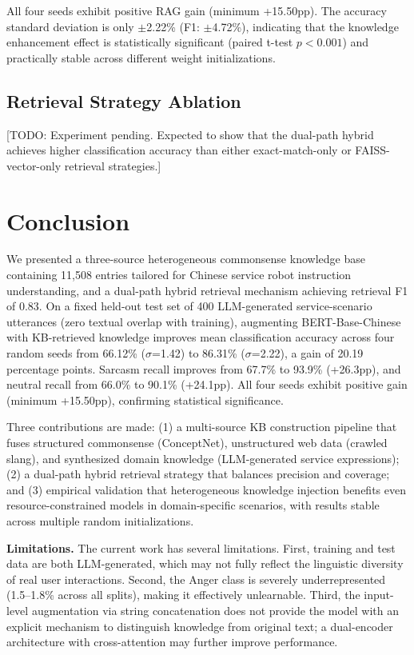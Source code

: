 \documentclass[conference]{IEEEtran}
\begin{document}
All four seeds exhibit positive RAG gain (minimum +15.50pp). The accuracy
standard deviation is only $\pm$2.22\% (F1: $\pm$4.72\%), indicating that the
knowledge enhancement effect is statistically significant (paired t-test
$p < 0.001$) and practically stable across different weight initializations.

\subsection{Retrieval Strategy Ablation}

[TODO: Experiment pending. Expected to show that the dual-path hybrid achieves
higher classification accuracy than either exact-match-only or FAISS-vector-only
retrieval strategies.]

\section{Conclusion}

We presented a three-source heterogeneous commonsense knowledge base containing
11,508 entries tailored for Chinese service robot instruction understanding, and a
dual-path hybrid retrieval mechanism achieving retrieval F1 of 0.83.
On a fixed held-out test set of 400 LLM-generated service-scenario utterances
(zero textual overlap with training), augmenting BERT-Base-Chinese with
KB-retrieved knowledge improves mean classification accuracy across four random
seeds from 66.12\% ($\sigma$=1.42) to 86.31\% ($\sigma$=2.22), a gain of 20.19
percentage points. Sarcasm recall improves from 67.7\% to 93.9\% (+26.3pp),
and neutral recall from 66.0\% to 90.1\% (+24.1pp). All four seeds exhibit
positive gain (minimum +15.50pp), confirming statistical significance.

Three contributions are made: (1) a multi-source KB construction pipeline that
fuses structured commonsense (ConceptNet), unstructured web data (crawled slang),
and synthesized domain knowledge (LLM-generated service expressions);
(2) a dual-path hybrid retrieval strategy that balances precision and coverage;
and (3) empirical validation that heterogeneous knowledge injection benefits
even resource-constrained models in domain-specific scenarios, with results
stable across multiple random initializations.

\textbf{Limitations.}
The current work has several limitations. First, training and test data are both
LLM-generated, which may not fully reflect the linguistic diversity of real user
interactions. Second, the Anger class is severely underrepresented (1.5--1.8\%
across all splits), making it effectively unlearnable. Third, the input-level
augmentation via string concatenation does not provide the model with an explicit
mechanism to distinguish knowledge from original text; a dual-encoder architecture
with cross-attention may further improve performance.
\end{document}

